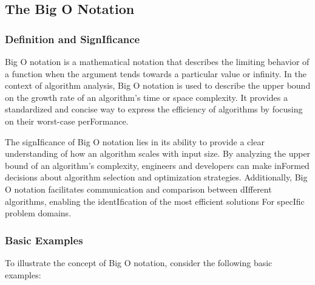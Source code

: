 \documentclass[12pt]{book} %
\begin{document}
\subsection{The Big O Notation}
\subsubsection{Definition and SignIficance}

Big O notation is a mathematical notation that describes the limiting behavior of a function when the argument tends towards a particular value or infinity. In the context of algorithm analysis, Big O notation is used to describe the upper bound on the growth rate of an algorithm's time or space complexity. It provides a standardized and concise way to express the efficiency of algorithms by focusing on their worst-case perFormance.

The signIficance of Big O notation lies in its ability to provide a clear understanding of how an algorithm scales with input size. By analyzing the upper bound of an algorithm's complexity, engineers and developers can make inFormed decisions about algorithm selection and optimization strategies. Additionally, Big O notation facilitates communication and comparison between dIfferent algorithms, enabling the identIfication of the most efficient solutions For specIfic problem domains.

\subsubsection{Basic Examples}

To illustrate the concept of Big O notation, consider the following basic examples:
\end{document}
